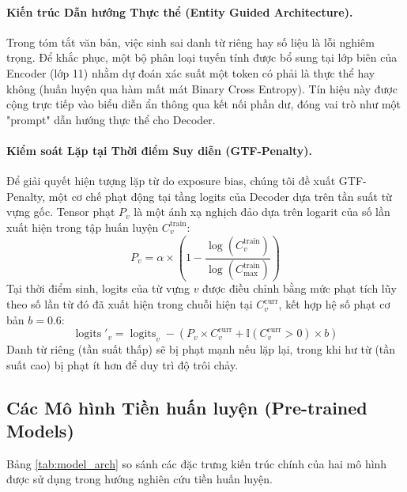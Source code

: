 \documentclass{article}
\begin{document}
\paragraph{Kiến trúc Dẫn hướng Thực thể (Entity Guided Architecture).}
Trong tóm tắt văn bản, việc sinh sai danh từ riêng hay số liệu là lỗi nghiêm trọng. Để khắc phục, một bộ phân loại tuyến tính được bổ sung tại lớp biên của Encoder (lớp 11) nhằm dự đoán xác suất một token có phải là thực thể hay không (huấn luyện qua hàm mất mát Binary Cross Entropy). Tín hiệu này được cộng trực tiếp vào biểu diễn ẩn thông qua kết nối phần dư, đóng vai trò như một "prompt" dẫn hướng thực thể cho Decoder.

\paragraph{Kiểm soát Lặp tại Thời điểm Suy diễn (GTF-Penalty).}
Để giải quyết hiện tượng lặp từ do exposure bias, chúng tôi đề xuất GTF-Penalty, một cơ chế phạt động tại tầng logits của Decoder dựa trên tần suất từ vựng gốc. Tensor phạt $P_v$ là một ánh xạ nghịch đảo dựa trên logarit của số lần xuất hiện trong tập huấn luyện $C_v^{\text{train}}$:
\begin{equation}
    P_v = \alpha \times \left( 1 - \frac{\log(C_v^{\text{train}})}{\log(C_{\max}^{\text{train}})} \right)
\end{equation}
Tại thời điểm sinh, logits của từ vựng $v$ được điều chỉnh bằng mức phạt tích lũy theo số lần từ đó đã xuất hiện trong chuỗi hiện tại $C_v^{\text{curr}}$, kết hợp hệ số phạt cơ bản $b=0.6$:
\begin{equation}
    \operatorname{logits}'_v = \operatorname{logits}_v - \left( P_v \times C_v^{\text{curr}} + \mathbb{I}(C_v^{\text{curr}}>0) \times b \right)
\end{equation}
Danh từ riêng (tần suất thấp) sẽ bị phạt mạnh nếu lặp lại, trong khi hư từ (tần suất cao) bị phạt ít hơn để duy trì độ trôi chảy.

\subsection{Các Mô hình Tiền huấn luyện (Pre-trained Models)}

Bảng \ref{tab:model_arch} so sánh các đặc trưng kiến trúc chính của hai mô hình được sử dụng trong hướng nghiên cứu tiền huấn luyện.
\end{document}
